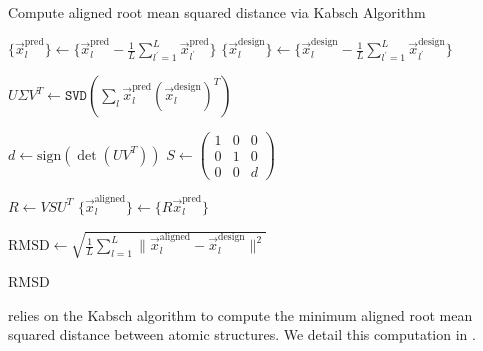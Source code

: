
\begin{algorithm}
\caption{Compute aligned root mean squared distance via Kabsch
Algorithm}\label{alg:compute_aligned_rmsd}
\begin{algorithmic}
    \State $\{\vec{x}_l^{\mathrm{pred}}\} \leftarrow \{\vec{x}^{\mathrm{pred}}_{l} -\frac{1}{L}\sum_{l^\prime=1}^{L} \vec{x}^{\mathrm{pred}}_{l^\prime}\}$
    \State $\{\vec{x}_l^{\mathrm{design}}\} \leftarrow \{\vec{x}^{\mathrm{design}}_{l} - \frac{1}{L}\sum_{l^\prime=1}^{L} \vec{x}^{\mathrm{design}}_{l^\prime}\}$
    
    
    \State
    \State $U\Sigma V^T \leftarrow \texttt{SVD}( \sum_{l} \vec{x}_l^{\mathrm{pred}}(\vec{x}_l^{\mathrm{design}})^T)$
    
    \State
    \State $d \leftarrow \text{sign}(\det(UV^T))$
    \State $S \leftarrow \begin{pmatrix} 1 & 0 & 0 \\ 0 & 1 & 0 \\ 0 & 0 & d \end{pmatrix}$
    
    \State
    \State $R \leftarrow VS U^T$
    \State $\{\vec{x}_l^{\mathrm{aligned}}\} \leftarrow \{R\vec{x}_l^{\mathrm{pred}}\}$
    
    \State
    \State $\text{RMSD} \leftarrow \sqrt{\frac{1}{L}\sum_{l=1}^{L} \|\vec{x}^{\mathrm{aligned}}_{l} - \vec{x}^{\mathrm{design}}_{l}\|^2}$
    
    \Return RMSD
\EndProcedure
\end{algorithmic}
\end{algorithm}

 relies on the 
Kabsch algorithm to compute the minimum aligned root mean squared distance between atomic structures.
We detail this computation in .

